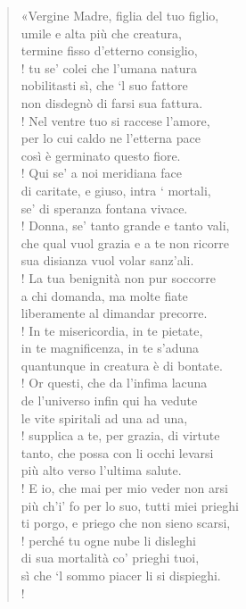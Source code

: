 \documentclass[a4paper, twoside, titlepage]{book}
\begin{document}
\begin{verse}
«Vergine Madre, figlia del tuo figlio,\\
umile e alta più che creatura,\\
termine fisso d’etterno consiglio,\\!
tu se’ colei che l’umana natura\\
nobilitasti sì, che ‘l suo fattore\\
non disdegnò di farsi sua fattura.\\!
Nel ventre tuo si raccese l’amore,\\
per lo cui caldo ne l’etterna pace\\
così è germinato questo fiore.\\!
Qui se’ a noi meridiana face\\
di caritate, e giuso, intra ‘ mortali,\\
se’ di speranza fontana vivace.\\!
Donna, se’ tanto grande e tanto vali,\\
che qual vuol grazia e a te non ricorre\\
sua disianza vuol volar sanz’ali.\\!
La tua benignità non pur soccorre\\
a chi domanda, ma molte fiate\\
liberamente al dimandar precorre.\\!
In te misericordia, in te pietate,\\
in te magnificenza, in te s’aduna\\
quantunque in creatura è di bontate.\\!
Or questi, che da l’infima lacuna\\
de l’universo infin qui ha vedute\\
le vite spiritali ad una ad una,\\!
supplica a te, per grazia, di virtute\\
tanto, che possa con li occhi levarsi\\
più alto verso l’ultima salute.\\!
E io, che mai per mio veder non arsi\\
più ch’i’ fo per lo suo, tutti miei prieghi\\
ti porgo, e priego che non sieno scarsi,\\!
perché tu ogne nube li disleghi\\
di sua mortalità co’ prieghi tuoi,\\
sì che ‘l sommo piacer li si dispieghi.\\!

\end{verse}
\end{document}
